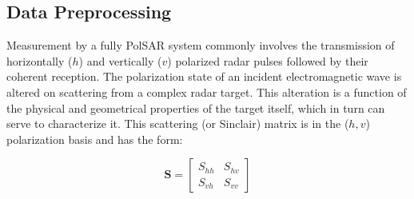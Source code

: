 	
\subsection{Data Preprocessing}
\label{sec:stage1}





Measurement by a fully PolSAR system commonly involves the transmission of horizontally ($h$) and vertically ($v$) polarized radar pulses followed by their coherent reception. The polarization state of an incident electromagnetic wave is altered on scattering from a complex radar target. This alteration is a function of the physical and geometrical properties of the target itself, which in turn can serve to characterize it. This scattering  (or Sinclair) matrix is in the ($h,v$) polarization basis and has the form:


\begin{equation}
\mathbf{S} =
  \begin{bmatrix}
    S_{hh} & S_{hv}  \\
    S_{vh} & S_{vv}
  \end{bmatrix}
 \label{eqn:scattring}
\end{equation}


